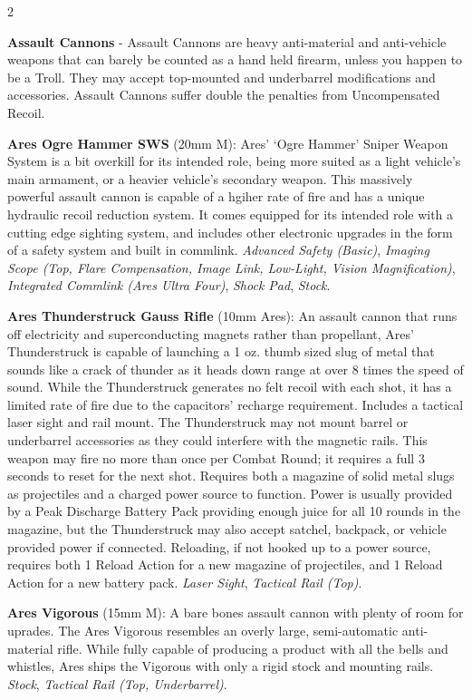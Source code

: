 \documentclass[
  oneside]{article}
\begin{document}
\begin{multicols}{2}

\textbf{Assault Cannons} - Assault Cannons are
heavy anti-material and anti-vehicle weapons that
can barely be counted as a hand held firearm,
unless you happen to be a Troll. They may accept
top-mounted and underbarrel modifications and
accessories. Assault Cannons suffer double the
penalties from Uncompensated Recoil.

\textbf{Ares Ogre Hammer SWS} (20mm M): Ares'
`Ogre Hammer' Sniper Weapon System is a bit
overkill for its intended role, being more suited
as a light vehicle's main armament, or a heavier
vehicle's secondary weapon. This massively
powerful assault cannon is capable of a hgiher
rate of fire and has a unique hydraulic recoil
reduction system. It comes equipped for its
intended role with a cutting edge sighting system,
and includes other electronic upgrades in the form
of a safety system and built in commlink.
\emph{Advanced Safety (Basic)}, \emph{Imaging
Scope (Top, Flare Compensation, Image Link,
Low-Light, Vision Magnification)},
\emph{Integrated Commlink (Ares Ultra Four)},
\emph{Shock Pad}, \emph{Stock}.

\textbf{Ares Thunderstruck Gauss Rifle} (10mm
Ares): An assault cannon that runs off electricity
and superconducting magnets rather than
propellant, Ares' Thunderstruck is capable of
launching a 1 oz. thumb sized slug of metal that
sounds like a crack of thunder as it heads down
range at over 8 times the speed of sound. While
the Thunderstruck generates no felt recoil with
each shot, it has a limited rate of fire due to
the capacitors' recharge requirement. Includes a
tactical laser sight and rail mount. The
Thunderstruck may not mount barrel or underbarrel
accessories as they could interfere with the
magnetic rails. This weapon may fire no more than
once per Combat Round; it requires a full 3
seconds to reset for the next shot. Requires both
a magazine of solid metal slugs as projectiles and
a charged power source to function. Power is
usually provided by a Peak Discharge Battery Pack
providing enough juice for all 10 rounds in the
magazine, but the Thunderstruck may also accept
satchel, backpack, or vehicle provided power if
connected. Reloading, if not hooked up to a power
source, requires both 1 Reload Action for a new
magazine of projectiles, and 1 Reload Action for a
new battery pack. \emph{Laser Sight},
\emph{Tactical Rail (Top)}.

\textbf{Ares Vigorous} (15mm M): A bare bones
assault cannon with plenty of room for uprades.
The Ares Vigorous resembles an overly large,
semi-automatic anti-material rifle. While fully
capable of producing a product with all the bells
and whistles, Ares ships the Vigorous with only a
rigid stock and mounting rails. \emph{Stock},
\emph{Tactical Rail (Top, Underbarrel)}.


\end{multicols}
\end{document}

